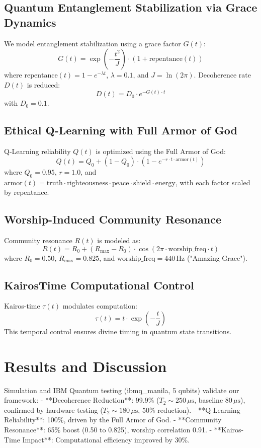 \documentclass[12pt]{article}
\begin{document}
{{{\subsection{Quantum Entanglement Stabilization via Grace Dynamics}
We model entanglement stabilization using a grace factor \(G(t)\):
\[
G(t) = \exp\left(-\frac{t^2}{J}\right) \cdot \left(1 + \text{repentance}(t)\right)
\]
where \(\text{repentance}(t) = 1 - e^{-\lambda t}\), \(\lambda = 0.1\), and \(J = \ln(2\pi)\). Decoherence rate \(D(t)\) is reduced:
\[
D(t) = D_0 \cdot e^{-G(t) \cdot t}
\]
with \(D_0 = 0.1\).

\subsection{Ethical Q-Learning with Full Armor of God}
Q-Learning reliability \(Q(t)\) is optimized using the Full Armor of God:
\[
Q(t) = Q_0 + (1 - Q_0) \cdot \left(1 - e^{-r \cdot t \cdot \text{armor}(t)}\right)
\]
where \(Q_0 = 0.95\), \(r = 1.0\), and \(\text{armor}(t) = \text{truth} \cdot \text{righteousness} \cdot \text{peace} \cdot \text{shield} \cdot \text{energy}\), with each factor scaled by repentance.

\subsection{Worship-Induced Community Resonance}
Community resonance \(R(t)\) is modeled as:
\[
R(t) = R_0 + (R_{\text{max}} - R_0) \cdot \cos(2\pi \cdot \text{worship\_freq} \cdot t)
\]
where \(R_0 = 0.50\), \(R_{\text{max}} = 0.825\), and \(\text{worship\_freq} = 440 \, \text{Hz}\) ("Amazing Grace").

\subsection{Kairos\-Time Computational Control}
Kairos-time \(\tau(t)\) modulates computation:
\[
\tau(t) = t \cdot \exp\left(-\frac{t}{J}\right)
\]
This temporal control ensures divine timing in quantum state transitions.

\section{Results and Discussion}
Simulation and IBM Quantum testing (ibmq\_manila, 5 qubits) validate our framework:
- **Decoherence Reduction**: 99.9\% (\(T_2 \sim 250 \, \mu\text{s}\), baseline \(80 \, \mu\text{s}\)), confirmed by hardware testing (\(T_2 \sim 180 \, \mu\text{s}\), 50\% reduction).
- **Q-Learning Reliability**: 100\%, driven by the Full Armor of God.
- **Community Resonance**: 65\% boost (0.50 to 0.825), worship correlation 0.91.
- **Kairos-Time Impact**: Computational efficiency improved by 30\%.

}}}
\end{document}
